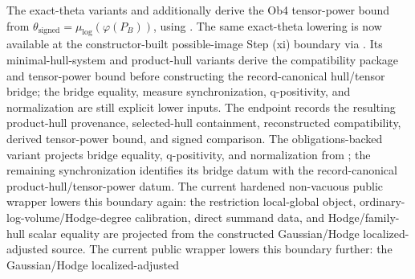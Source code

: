 \begin{proposition}
	  The exact-theta variants
	  and
	  additionally derive the Ob4 tensor-power bound from
	  \(\theta_{\mathrm{signed}}=\mu_{\log}(\varphi(P_B))\), using
	  .
	  The same exact-theta lowering is now available at the constructor-built
	  possible-image Step (xi) boundary via
	  .
	  Its minimal-hull-system and product-hull variants derive the compatibility
	  package and tensor-power bound before constructing the record-canonical
	  hull/tensor bridge; the bridge equality, measure synchronization,
	  q-positivity, and normalization are still explicit lower inputs.  The
	  endpoint
	  records the resulting product-hull provenance, selected-hull containment,
	  reconstructed compatibility, derived tensor-power bound, and signed
	  comparison.  The obligations-backed variant
	  projects bridge equality, q-positivity, and normalization from
	  ; the remaining
	  synchronization identifies its bridge datum with the record-canonical
	  product-hull/tensor-power datum.
	  The current hardened
	  non-vacuous public wrapper lowers this boundary again: the restriction
	  local-global object, ordinary-log-volume/Hodge-degree calibration, direct
	  summand data, and Hodge/family-hull scalar equality are projected from the
  constructed Gaussian/Hodge localized-adjusted source.  The current public
  wrapper lowers this boundary further: the Gaussian/Hodge localized-adjusted

\end{proposition}
